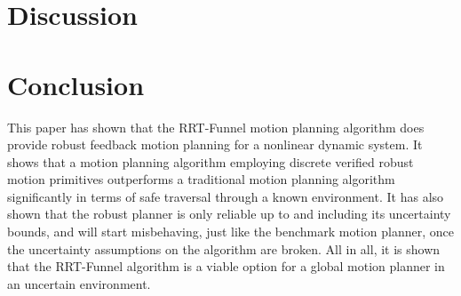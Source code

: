\documentclass[conference]{IEEEtran}
\newcommand{\rrtfunnel}{RRT-Funnel}
\newcommand{\0}{\mathbf{0}}
\newcommand{\1}{\mathbf{1}}
\begin{document}
\section{Discussion}


\section{Conclusion}

This paper has shown that the \rrtfunnel{} motion planning algorithm does
provide robust feedback motion planning for a nonlinear dynamic system. It shows
that a motion planning algorithm employing discrete verified robust motion
primitives outperforms a traditional motion planning algorithm significantly in
terms of safe traversal through a known environment. It has also shown that the
robust planner is only reliable up to and including its uncertainty bounds, and
will start misbehaving, just like the benchmark motion planner, once the
uncertainty assumptions on the algorithm are broken. All in all, it is shown
that the \rrtfunnel{} algorithm is a viable option for a global motion planner
in an uncertain environment.




%
%
\end{document}
